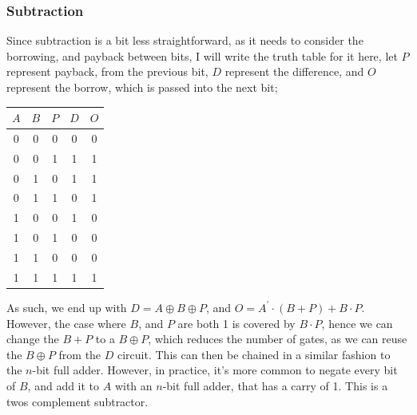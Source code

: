 \documentclass[a4paper, 12pt]{article}
\begin{document}
            \subsubsection*{Subtraction}
                Since subtraction is a bit less straightforward, as it needs to consider the borrowing, and payback between bits, I will write the truth table for it here, let $P$ represent payback, from the previous bit, $D$ represent the difference, and $O$ represent the borrow, which is passed into the next bit;
                \begin{center}
                    \begin{tabular}{c|c|c||c|c}
                        $A$ & $B$ & $P$ & $D$ & $O$ \\
                        \hline
                        0 & 0 & 0 & 0 & 0 \\
                        0 & 0 & 1 & 1 & 1 \\
                        0 & 1 & 0 & 1 & 1 \\
                        0 & 1 & 1 & 0 & 1 \\
                        1 & 0 & 0 & 1 & 0 \\
                        1 & 0 & 1 & 0 & 0 \\
                        1 & 1 & 0 & 0 & 0 \\
                        1 & 1 & 1 & 1 & 1 \\
                    \end{tabular}
                \end{center}
                As such, we end up with $D = A \oplus B \oplus P$, and $O = A^\prime \cdot (B + P) + B \cdot P$. However, the case where $B$, and $P$ are both 1 is covered by $B \cdot P$, hence we can change the $B + P$ to a $B \oplus P$, which reduces the number of gates, as we can reuse the $B \oplus P$ from the $D$ circuit. This can then be chained in a similar fashion to the $n$-bit full adder. However, in practice, it's more common to negate every bit of $B$, and add it to $A$ with an $n$-bit full adder, that has a carry of 1. This is a twos complement subtractor.
\end{document}

